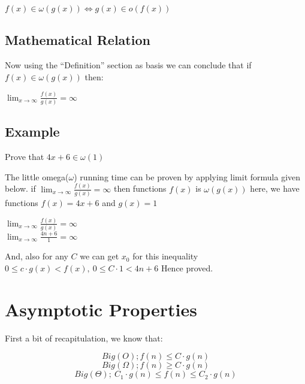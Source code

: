 \documentclass[a4paper,12pt]{article}
\theoremstyle{definition}
\begin{document}
    \begin{center}
        $f(x) \in \omega(g(x)) \Leftrightarrow g(x) \in o(f(x))$
    \end{center}

    \subsection{Mathematical Relation}

    Now using the ``Definition'' section as basis we can conclude that
    if $f(x) \in \omega(g(x))$ then:

    \begin{center}
        $\lim_{x \rightarrow \infty}{\frac{f(x)}{g(x)}} = \infty$
    \end{center}

    \subsection{Example}

    Prove that $4x + 6 \in \omega(1)$

    The little omega($\omega$) running time can be proven by applying limit formula given below.
    if $\lim_{x \rightarrow \infty}{\frac{f(x)}{g(x)}} = \infty$ then functions $f(x)$ is $\omega(g(x))$
    here, we have functions $f(x) = 4x+6$ and $g(x) = 1$

    \begin{center}
        $\lim_{x \rightarrow \infty}{\frac{f(x)}{g(x)}} = \infty$\\
        $\lim_{x \rightarrow \infty}{\frac{4n + 6}{1}} = \infty$
    \end{center}

    And, also for any $C$ we can get $x_0$ for this inequality $0 \leq c \cdot g(x) < f(x),\ 0 \leq C \cdot 1 < 4n + 6$
    Hence proved.


    \section{Asymptotic Properties}

    First a bit of recapitulation, we know that:

    \begin{equation}
        Big(O); f(n) \leq C \cdot g(n)
        \label{eq:bigoh}
    \end{equation}
    \begin{equation}
        Big(\Omega); f(n) \geq C \cdot g(n)
        \label{eq:bigom}
    \end{equation}
    \begin{equation}
        Big(\Theta);\: C_1 \cdot g(n) \leq f(n) \leq C_2 \cdot g(n)
        \label{eq:bigth}
    \end{equation}
\end{document}

